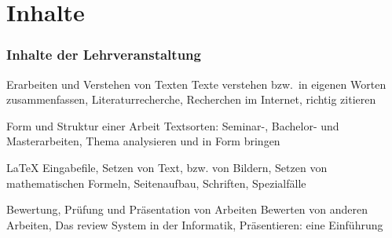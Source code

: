 \section{Inhalte}
\begin{frame}
\frametitle{Inhalte der Lehrveranstaltung}

\begin{mybox}{Erarbeiten und Verstehen von Texten}
Texte verstehen bzw.\ in eigenen Worten zusammenfassen,
Literaturrecherche, Recherchen im Internet, richtig zitieren
\end{mybox}

\bigskip

\begin{mybox}{Form und Struktur einer Arbeit} 
\alert<2->{Textsorten: Seminar-, Bachelor- und Masterarbeiten, Thema analysieren und in Form bringen}
\end{mybox}

\bigskip

\begin{mybox}{\LaTeX}
Eingabefile, Setzen von Text, bzw. von Bildern, 
Setzen von mathematischen Formeln,  Seitenaufbau,
Schriften, Spezialfälle
\end{mybox}

\bigskip

\begin{mybox}{Bewertung, Prüfung und Präsentation von Arbeiten}
Bewerten von anderen Arbeiten, Das review System in der Informatik,
Präsentieren: eine Einführung
\end{mybox}
\end{frame}

